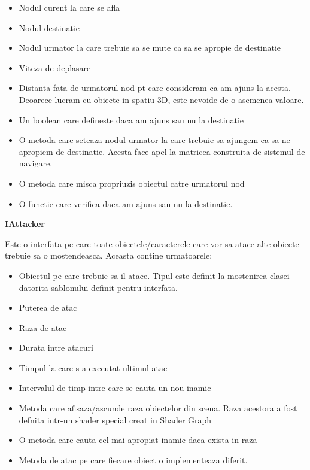 \documentclass[12pt, a4paper]{article}
\begin{document}
	\begin{itemize}
		\item Nodul curent la care se afla
		\item Nodul destinatie
		\item Nodul urmator la care trebuie sa se mute ca sa se apropie de destinatie
		\item Viteza de deplasare
		\item Distanta fata de urmatorul nod pt care consideram ca am ajuns la acesta. Deoarece lucram cu obiecte in spatiu 3D, este nevoide de o asemenea valoare.
		\item Un boolean care defineste daca am ajuns sau nu la destinatie
		\item O metoda care seteaza nodul urmator la care trebuie sa ajungem ca sa ne apropiem de destinatie. Acesta face apel la matricea construita de sistemul de navigare.
		\item O metoda care misca propriuzis obiectul catre urmatorul nod
		\item O functie care verifica daca am ajuns sau nu la destinatie.
	\end{itemize}
	\bigskip


	\textbf{IAttacker}
	
	 Este o interfata pe care toate obiectele/caracterele care vor sa atace alte obiecte trebuie sa o mostendeasca. Aceasta contine urmatoarele:
	 
	 \begin{itemize}
	 	\item Obiectul pe care trebuie sa il atace. Tipul este definit la mostenirea clasei datorita sablonului definit pentru interfata.
	 	\item Puterea de atac
	 	\item Raza de atac
	 	\item Durata intre atacuri
	 	\item Timpul la care s-a executat ultimul atac
	 	\item Intervalul de timp intre care se cauta un nou inamic
	 	\item Metoda care afisaza/ascunde raza obiectelor din scena. Raza acestora a fost defnita intr-un shader special creat in Shader Graph
	 	\item O metoda care cauta cel mai apropiat inamic daca exista in raza
	 	\item Metoda de atac pe care fiecare obiect o implementeaza diferit.
	\end{itemize}
 	\bigskip
 	
\end{document}
